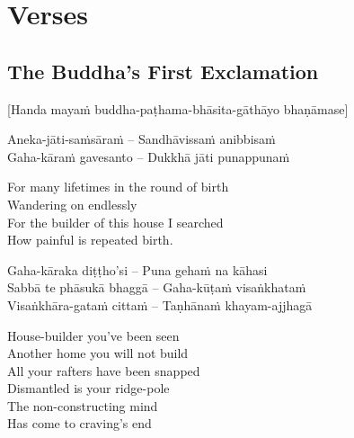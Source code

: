 
\chapter{Verses}

\section{The Buddha's First Exclamation}
\label{buddhas-first-exclamation}

\begin{center}
  [Handa mayaṁ buddha-paṭhama-bhāsita-gāthāyo bhaṇāmase]
\end{center}

\begin{twochants}
  Aneka-jāti-saṁsāraṁ – Sandhāvissaṁ anibbisaṁ\\
  Gaha-kāraṁ gavesanto – Dukkhā jāti punappunaṁ\\
\end{twochants}

\begin{english}
  For many lifetimes in the round of birth\\
  Wandering on endlessly\\
  For the builder of this house I searched\\
  How painful is repeated birth.
\end{english}

\begin{twochants}
  Gaha-kāraka diṭṭho'si – Puna gehaṁ na kāhasi\\
  Sabbā te phāsukā bhaggā – Gaha-kūṭaṁ visaṅkhataṁ\\
  Visaṅkhāra-gataṁ cittaṁ – Taṇhānaṁ khayam-ajjhagā\\
\end{twochants}

\begin{english}
  House-builder you've been seen\\
  Another home you will not build\\
  All your rafters have been snapped\\
  Dismantled is your ridge-pole\\
  The non-constructing mind\\
  Has come to craving's end
\end{english}

\suttaRef{[Dhp 153-154]}

